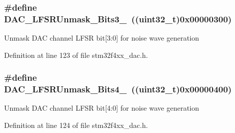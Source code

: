 \hypertarget{group___d_a_c__lfsrunmask__triangleamplitude_gafe219362b3a48d8678a65ef38cb45532}{
\subsubsection[{D\-A\-C\-\_\-\-L\-F\-S\-R\-Unmask\-\_\-\-Bits3\-\_\-0}]{\setlength{\rightskip}{0pt plus 5cm}\#define D\-A\-C\-\_\-\-L\-F\-S\-R\-Unmask\-\_\-\-Bits3\-\_~((uint32\-\_\-t)0x00000300)}}\label{group___d_a_c__lfsrunmask__triangleamplitude_gafe219362b3a48d8678a65ef38cb45532}
Unmask D\-A\-C channel L\-F\-S\-R bit\mbox{[}3\-:0\mbox{]} for noise wave generation 

Definition at line 123 of file stm32f4xx\-\_\-dac.\-h.

\hypertarget{group___d_a_c__lfsrunmask__triangleamplitude_ga2543d802e19d592a26c8231be663cdac}{
\subsubsection[{D\-A\-C\-\_\-\-L\-F\-S\-R\-Unmask\-\_\-\-Bits4\-\_\-0}]{\setlength{\rightskip}{0pt plus 5cm}\#define D\-A\-C\-\_\-\-L\-F\-S\-R\-Unmask\-\_\-\-Bits4\-\_~((uint32\-\_\-t)0x00000400)}}\label{group___d_a_c__lfsrunmask__triangleamplitude_ga2543d802e19d592a26c8231be663cdac}
Unmask D\-A\-C channel L\-F\-S\-R bit\mbox{[}4\-:0\mbox{]} for noise wave generation 

Definition at line 124 of file stm32f4xx\-\_\-dac.\-h.

